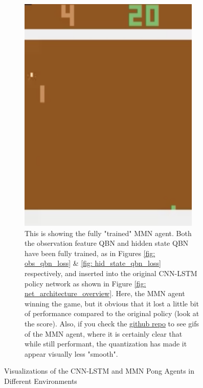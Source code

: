\begin{figure}[ht!]
\begin{subfigure}[t]{0.48\linewidth}
        \label{fig: single_env_cnn-lstm_agent}
    \end{subfigure}
    \begin{subfigure}[t]{0.48\linewidth}
        \captionsetup{width=0.95\linewidth}
        \includegraphics[width=0.95\textwidth]{Figures/single_env_mmn_agent.png}
        \caption{This is showing the fully "trained" MMN agent. Both the observation feature QBN and hidden state QBN have been fully trained, as in Figures \ref{fig: obs_qbn_loss} \& \ref{fig: hid_state_qbn_loss} respectively, and inserted into the original CNN-LSTM policy network as shown in Figure \ref{fig: net_architecture_overview}. Here, the MMN agent winning the game, but it obvious that it lost a little bit of performance compared to the original policy (look at the score). Also, if you check the \href{https://github.com/nicholasRenninger/NeuralMooreMachine_Experiments}{github repo} to see gifs of the MMN agent, where it is certainly clear that while still performant, the quantization has made it appear visually less "smooth".}
        \label{fig: single_env_mmn_agent}
    \end{subfigure}
    \caption{Visualizations of the CNN-LSTM and MMN Pong Agents in Different Environments}
    \label{fig: environments}
\end{figure}